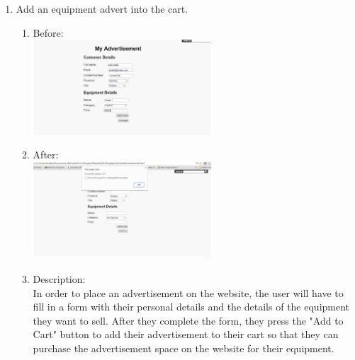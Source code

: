 \documentclass[11pt]{article}
\begin{document}
\begin{enumerate}
		\item Add an equipment advert into the cart.
			\begin{enumerate}
				\item Before: \\
					 \includegraphics[width=0.55\textwidth]{../Images/Tasks/Task8Before.png}
				\item After: \\
					\includegraphics[width=0.55\textwidth]{../Images/Tasks/Task8After.png}
					\item Description: \\In order to place an advertisement on the website, the user will have to fill in a form with their personal details and the details of the equipment they want to sell. After they complete the form, they press the "Add to Cart" button to add their advertisement to their cart so that they can purchase the advertisement space on the website for their equipment. \newpage
			\end{enumerate}
				

\end{enumerate}
\end{document}
